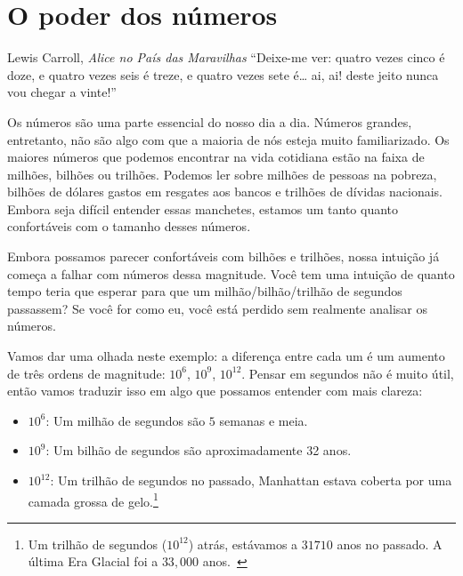 \chapter{O poder dos números}
\label{les:15}

\begin{chapquote}{Lewis Carroll, \textit{Alice no País das Maravilhas}}
\enquote{Deixe-me ver: quatro vezes cinco é doze, e quatro vezes seis é treze, e quatro vezes sete é… ai, ai! deste jeito nunca vou chegar a vinte!}
\end{chapquote}

Os números são uma parte essencial do nosso dia a dia. Números grandes, entretanto, não são algo com que a maioria de nós esteja muito familiarizado. Os maiores números que podemos encontrar na vida cotidiana estão na faixa de milhões, bilhões ou trilhões. Podemos ler sobre milhões de pessoas na pobreza, bilhões de dólares gastos em resgates aos bancos e trilhões de dívidas nacionais. Embora seja difícil entender essas manchetes, estamos um tanto quanto confortáveis com o tamanho desses números.

Embora possamos parecer confortáveis com bilhões e trilhões, nossa intuição já começa a falhar com números dessa magnitude. Você tem uma intuição de quanto tempo teria que esperar para que um milhão/bilhão/trilhão de segundos passassem? Se você for como eu, você está perdido sem realmente analisar os números.

Vamos dar uma olhada neste exemplo: a diferença entre cada um é um aumento de três ordens de magnitude: $10^6$, $10^9$, $10^{12}$. Pensar em segundos não é muito útil, então vamos traduzir isso em algo que possamos entender com mais clareza:

\begin{itemize}
  \item $10^6$: Um milhão de segundos são $5$ semanas e meia.
  \item $10^9$: Um bilhão de segundos são aproximadamente 32 anos.
  \item $10^{12}$: Um trilhão de segundos no passado, Manhattan estava coberta por uma camada grossa de gelo.\footnote{Um trilhão de segundos ($10^{12}$) atrás, estávamos a $31710$ anos no passado. A última Era Glacial foi a $33,000$ anos.~\cite{wiki:LGM}}
\end{itemize}

